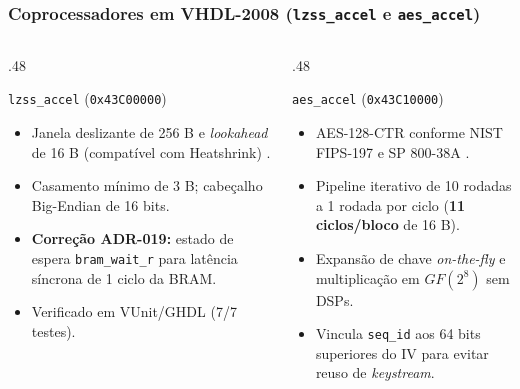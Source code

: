 \documentclass[../main.tex]{subfiles}
\begin{document}

\begin{frame}
  \frametitle{Coprocessadores em VHDL-2008 (\texttt{lzss\_accel} e \texttt{aes\_accel})}
  \begin{columns}[T]
    \begin{column}{.48\textwidth}
      \begin{block}{\texttt{lzss\_accel} (\texttt{0x43C00000})}
        \begin{itemize}
          \item Janela deslizante de 256 B e \textit{lookahead} de 16 B (compat\'ivel com Heatshrink) \autocite{Heatshrink}.
          \item Casamento m\'inimo de 3 B; cabe\c{c}alho Big-Endian de 16 bits.
          \item \textbf{Corre\c{c}\~ao ADR-019:} estado de espera \texttt{bram\_wait\_r} para lat\^encia s\'incrona de 1 ciclo da BRAM.
          \item Verificado em VUnit/GHDL (7/7 testes).
        \end{itemize}
      \end{block}
    \end{column}
    \begin{column}{.48\textwidth}
      \begin{block}{\texttt{aes\_accel} (\texttt{0x43C10000})}
        \begin{itemize}
          \item AES-128-CTR conforme NIST FIPS-197 e SP 800-38A \autocite{NISTFIPS197,NISTSP80038A}.
          \item Pipeline iterativo de 10 rodadas a 1 rodada por ciclo (\textbf{11 ciclos/bloco} de 16 B).
          \item Expans\~ao de chave \textit{on-the-fly} e multiplica\c{c}\~ao em $GF(2^8)$ sem DSPs.
          \item Vincula \texttt{seq\_id} aos 64 bits superiores do IV para evitar reuso de \textit{keystream}.
        \end{itemize}
      \end{block}
    \end{column}
  \end{columns}
\end{frame}
\end{document}
